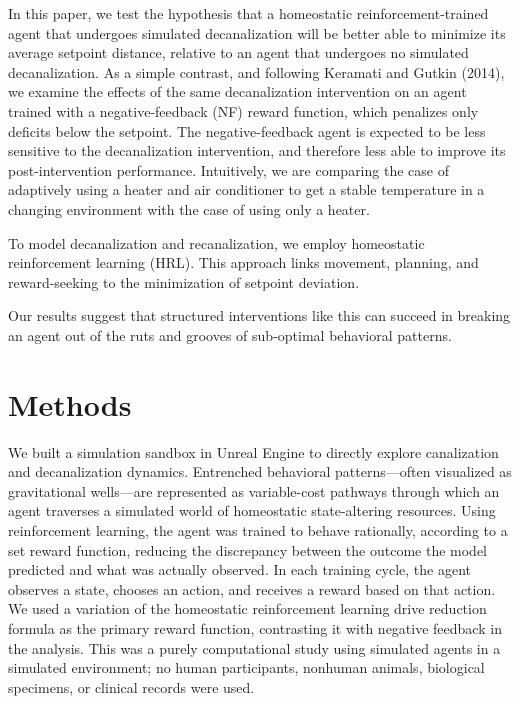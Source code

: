 \documentclass[12pt,fleqn]{article}
\begin{document}
In this paper, we test the hypothesis that a homeostatic reinforcement-trained agent that undergoes simulated decanalization will be better able to minimize its average setpoint distance, relative to an agent that undergoes no simulated decanalization. As a simple contrast, and following Keramati and Gutkin (2014), we examine the effects of the same decanalization intervention on an agent trained with a negative-feedback (NF) reward function, which penalizes only deficits below the setpoint. The negative-feedback agent is expected to be less sensitive to the decanalization intervention, and therefore less able to improve its post-intervention performance. Intuitively, we are comparing the case of adaptively using a heater and air conditioner to get a stable temperature in a changing environment with the case of using only a heater.

To model decanalization and recanalization, we employ homeostatic reinforcement learning (HRL). This approach links movement, planning, and reward-seeking to the minimization of setpoint deviation. 

Our results suggest that structured interventions like this can succeed in breaking an agent out of the ruts and grooves of sub-optimal behavioral patterns.


\section{Methods}

We built a simulation sandbox in Unreal Engine to directly explore canalization and decanalization dynamics. Entrenched behavioral patterns---often visualized as gravitational wells---are represented as variable-cost pathways through which an agent traverses a simulated world of homeostatic state-altering resources. Using reinforcement learning, the agent was trained to behave rationally, according to a set reward function, reducing the discrepancy between the outcome the model predicted and what was actually observed. In each training cycle, the agent observes a state, chooses an action, and receives a reward based on that action. We used a variation of the homeostatic reinforcement learning drive reduction formula as the primary reward function, contrasting it with negative feedback in the analysis. This was a purely computational study using simulated agents in a simulated environment; no human participants, nonhuman animals, biological specimens, or clinical records were used.
\end{document}
